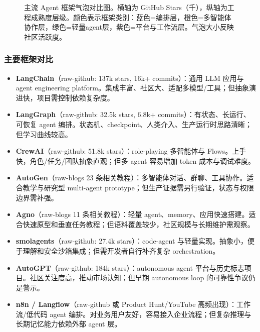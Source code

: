 \begin{figure}[htbp]
\caption{主流 Agent 框架气泡对比图。横轴为 GitHub Stars（千），纵轴为工程成熟度层级。颜色表示框架类别：蓝色=编排层，橙色=多智能体协作层，绿色=轻量agent层，紫色=平台与工作流层。气泡大小反映社区活跃度。}
\label{fig:ch6-bubble}
\end{figure}

\subsubsection{主要框架对比}

\begin{itemize}[nosep]
\item \textbf{LangChain}（raw-github: 137k stars, 16k+ commits）：通用 LLM 应用与 agent engineering platform。集成丰富、社区大、适配多模型/工具；但抽象演进快，项目需控制依赖复杂度。
\item \textbf{LangGraph}（raw-github: 32.5k stars, 6.8k+ commits）：有状态、长运行、可恢复 agent 编排。状态机、checkpoint、人类介入、生产运行时思路清晰；但学习曲线较高。
\item \textbf{CrewAI}（raw-github: 51.8k stars）：role-playing 多智能体与 Flows。上手快，角色/任务/团队抽象直观；但多 agent 容易增加 token 成本与调试难度。
\item \textbf{AutoGen}（raw-blogs 23 条相关教程）：多智能体对话、群聊、工具协作。适合教学与研究型 multi-agent prototype；但生产证据需另行验证，状态与权限边界需补强。
\item \textbf{Agno}（raw-blogs 11 条相关教程）：轻量 agent、memory、应用快速搭建。适合快速原型和垂直任务教程；但语料覆盖较少，社区规模与长期维护需观察。
\item \textbf{smolagents}（raw-github: 27.4k stars）：code-agent 与轻量实现。抽象小，便于理解和安全沙箱集成；但需开发者自行补齐复杂 orchestration。
\item \textbf{AutoGPT}（raw-github: 184k stars）：autonomous agent 平台与历史标志项目。社区关注度高，推动市场认知；但早期 autonomous loop 的可靠性争议仍是警示。
\item \textbf{n8n / Langflow}（raw-github 或 Product Hunt/YouTube 高频出现）：工作流/低代码 agent 编排。对业务用户友好，容易接入企业流程；但复杂推理与长期记忆能力依赖外部 agent 层。
\end{itemize}

